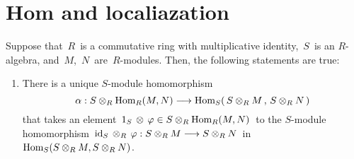 

\section{Hom and localiazation}
\setcounter{theorem}{0}
\setcounter{equation}{0}


\renewcommand{\theenumi}{\roman{enumi}}
\renewcommand{\labelenumi}{\textnormal{(\theenumi)}$\;\;$}


\begin{proposition}
\label{HomAndLocalization}
\mbox{}
\vskip 0.1cm
\noindent
Suppose that \,$R$\, is a commutative ring with multiplicative identity, \,$S$\, is an $R$-algebra, and \,$M$,\, $N$\, are \,$R$-modules.
Then, the following statements are true:
\begin{enumerate}
\item
	There is a unique $S$-module homomorphism
	\begin{equation*}
	\alpha : S \otimes_{R} \textnormal{Hom}_{R}(M,N) \longrightarrow \textnormal{Hom}_{S}\!\left(\,S\otimes_{R}M\,,\,S\otimes_{R}N\,\right)
	\end{equation*}
	that takes an element
	\,$1_{S}\,\otimes\,\varphi \in S \otimes_{R} \textnormal{Hom}_{R}(M, N)$\,
	to the $S$-module homomorphism
	\,$\textnormal{id}_{S} \,\otimes_{R}\, \varphi : S \otimes_{R} M \longrightarrow S \otimes_{R} N$\,
	in
	\,$\textnormal{Hom}_{S}(S \otimes_{R} M, S \otimes_{R} N)$.

\end{enumerate}
\end{proposition}
